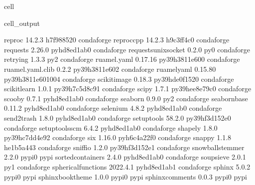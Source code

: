 \documentclass[letterpaper,table,10pt,english]{jupyterBook}
\begin{document}
\begin{sphinxuseclass}{cell}
\begin{sphinxVerbatimOutput}
\begin{sphinxuseclass}{cell_output}
\begin{sphinxVerbatim}[commandchars=\\\{\}]
reproc                    14.2.3               h7f98852\PYGZus{}0    conda\PYGZhy{}forge
reproc\PYGZhy{}cpp                14.2.3               h9c3ff4c\PYGZus{}0    conda\PYGZhy{}forge
requests                  2.26.0             pyhd8ed1ab\PYGZus{}0    conda\PYGZhy{}forge
requests\PYGZhy{}unixsocket       0.2.0                      py\PYGZus{}0    conda\PYGZhy{}forge
retrying                  1.3.3                      py\PYGZus{}2    conda\PYGZhy{}forge
ruamel.yaml               0.17.16          py39h3811e60\PYGZus{}0    conda\PYGZhy{}forge
ruamel.yaml.clib          0.2.2            py39h3811e60\PYGZus{}2    conda\PYGZhy{}forge
ruamel\PYGZus{}yaml               0.15.80         py39h3811e60\PYGZus{}1004    conda\PYGZhy{}forge
scikit\PYGZhy{}image              0.18.3           py39hde0f152\PYGZus{}0    conda\PYGZhy{}forge
scikit\PYGZhy{}learn              1.0.1            py39h7c5d8c9\PYGZus{}1    conda\PYGZhy{}forge
scipy                     1.7.1            py39hee8e79c\PYGZus{}0    conda\PYGZhy{}forge
scooby                    0.7.1              pyhd8ed1ab\PYGZus{}0    conda\PYGZhy{}forge
seaborn                   0.9.0                      py\PYGZus{}2    conda\PYGZhy{}forge
seaborn\PYGZhy{}base              0.11.2             pyhd8ed1ab\PYGZus{}0    conda\PYGZhy{}forge
selenium                  4.8.2              pyhd8ed1ab\PYGZus{}0    conda\PYGZhy{}forge
send2trash                1.8.0              pyhd8ed1ab\PYGZus{}0    conda\PYGZhy{}forge
setuptools                58.2.0           py39hf3d152e\PYGZus{}0    conda\PYGZhy{}forge
setuptools\PYGZhy{}scm            6.4.2              pyhd8ed1ab\PYGZus{}0    conda\PYGZhy{}forge
shapely                   1.8.0            py39hc7dd4e9\PYGZus{}2    conda\PYGZhy{}forge
six                       1.16.0             pyh6c4a22f\PYGZus{}0    conda\PYGZhy{}forge
snappy                    1.1.8                he1b5a44\PYGZus{}3    conda\PYGZhy{}forge
sniffio                   1.2.0            py39hf3d152e\PYGZus{}1    conda\PYGZhy{}forge
snowballstemmer           2.2.0                    pypi\PYGZus{}0    pypi
sortedcontainers          2.4.0              pyhd8ed1ab\PYGZus{}0    conda\PYGZhy{}forge
soupsieve                 2.0.1                      py\PYGZus{}1    conda\PYGZhy{}forge
spherical\PYGZus{}functions       2022.4.1           pyhd8ed1ab\PYGZus{}1    conda\PYGZhy{}forge
sphinx                    5.0.2                    pypi\PYGZus{}0    pypi
sphinx\PYGZhy{}book\PYGZhy{}theme         1.0.0                    pypi\PYGZus{}0    pypi
sphinx\PYGZhy{}comments           0.0.3                    pypi\PYGZus{}0    pypi

\end{sphinxVerbatim}
\end{sphinxuseclass}
\end{sphinxVerbatimOutput}
\end{sphinxuseclass}
\end{document}
